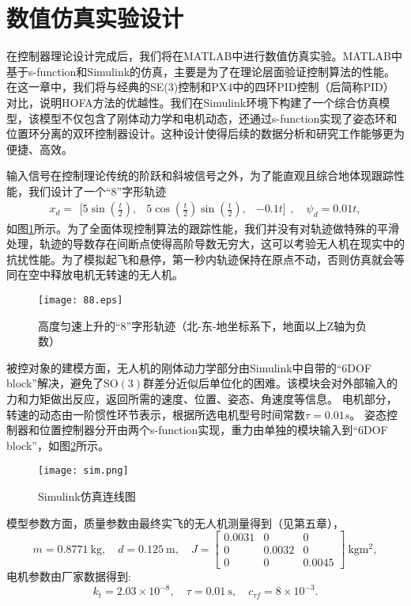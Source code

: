 \section{数值仿真实验设计}
在控制器理论设计完成后，我们将在MATLAB中进行数值仿真实验。MATLAB中基于s-function和Simulink的仿真，主要是为了在理论层面验证控制算法的性能。在这一章中，我们将与经典的SE(3)控制和PX4中的四环PID控制（后简称PID）对比，说明HOFA方法的优越性。我们在Simulink环境下构建了一个综合仿真模型，该模型不仅包含了刚体动力学和电机动态，还通过s-function实现了姿态环和位置环分离的双环控制器设计。这种设计使得后续的数据分析和研究工作能够更为便捷、高效。

输入信号在控制理论传统的阶跃和斜坡信号之外，为了能直观且综合地体现跟踪性能，我们设计了一个“8”字形轨迹
$$x_d = \begin{matrix}[5\sin(\frac{t}{2}), & 5\cos(\frac{t}{2})\sin(\frac{t}{2}), &-0.1t]\end{matrix},
\quad
\psi_d=0.01t,$$
如图\ref{fig:8}所示。为了全面体现控制算法的跟踪性能，我们并没有对轨迹做特殊的平滑处理，轨迹的导数存在间断点使得高阶导数无穷大，这可以考验无人机在现实中的抗扰性能。为了模拟起飞和悬停，第一秒内轨迹保持在原点不动，否则仿真就会等同在空中释放电机无转速的无人机。
\begin{figure}[!h]
  \centering
  \texttt{[image: 88.eps]}
  \caption{高度匀速上升的“8”字形轨迹（北-东-地坐标系下，地面以上Z轴为负数）}
  \label{fig:8}
\end{figure}

被控对象的建模方面，无人机的刚体动力学部分由Simulink中自带的“6DOF block”解决，避免了$\text{SO}(3)$群差分近似后单位化的困难。该模块会对外部输入的力和力矩做出反应，返回所需的速度、位置、姿态、角速度等信息。
电机部分，转速的动态由一阶惯性环节表示，根据所选电机型号时间常数$\tau=0.01s$。
姿态控制器和位置控制器分开由两个s-function实现，重力由单独的模块输入到“6DOF block”，如图\ref{fig:sim}所示。
\begin{figure}[!h]
    \centering
    \texttt{[image: sim.png]}
    \caption{Simulink仿真连线图}
    \label{fig:sim}
  \end{figure}

模型参数方面，质量参数由最终实飞的无人机测量得到（见第五章），
$$m=0.8771 \  \text{kg}, \quad d=0.125 \ \text{m}, \quad J=\begin{bmatrix}
  0.0031   &      0  &       0\\
  0 &   0.0032      &   0\\
  0  &       0   & 0.0045
\end{bmatrix} \  \text{kg}\text{m}{}^2,$$
电机参数由厂家数据得到:
$$k_t=2.03\times 10^{-8} ,\quad 
\tau=0.01 \ \text{s}, \quad
c_{\tau f}=8\times 10^{-3}.$$

